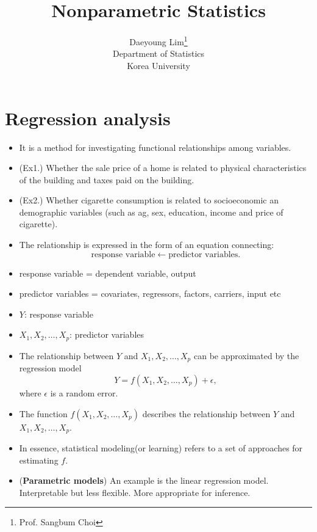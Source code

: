 \documentclass[11pt]{article}
\begin{document}
\nocite{*}

\title{Nonparametric Statistics}

\author{Daeyoung Lim\thanks{Prof. Sangbum Choi} \\
Department of Statistics \\
Korea University}

\maketitle

\section{Regression analysis}
\begin{itemize}
  \item It is a method for investigating functional relationships among variables.
  \item (Ex1.) Whether the sale price of a home is related to physical characteristics of the building and taxes paid on the building.
  \item (Ex2.) Whether cigarette consumption is related to socioeconomic an demographic variables (such as ag, sex, education, income and price of cigarette).
  \item The relationship is expressed in the form of an equation connecting:
  $$
    \text{response variable} \leftarrow \text{predictor variables}.
  $$
  \item response variable = dependent variable, output
  \item predictor variables = covariates, regressors, factors, carriers, input etc
  \item $Y$: response variable
  \item $X_{1}, X_{2}, \ldots , X_{p}$: predictor variables
  \item The relationship between $Y$ and $X_{1}, X_{2}, \ldots , X_{p}$ can be approximated by the regression model
  $$
    Y = f\left(X_{1}, X_{2}, \ldots , X_{p}\right) +\epsilon,
  $$
  where $\epsilon$ is a random error.
  \item The function $f\left(X_{1}, X_{2}, \ldots , X_{p}\right)$ describes the relationship between $Y$ and $X_{1}, X_{2}, \ldots , X_{p}$.
  \item In essence, statistical modeling(or learning) refers to a set of approaches for estimating $f$.
  \item (\textbf{Parametric models}) An example is the linear regression model. Interpretable but less flexible. More appropriate for inference.

\end{itemize}
\end{document}
